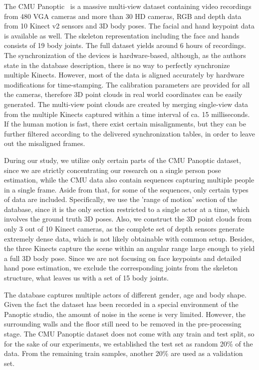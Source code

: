 The CMU Panoptic~\cite{Joo_2017_TPAMI} is a massive multi-view dataset containing video recordings from 480 VGA cameras and more than 30 HD cameras, RGB and depth data from 10 Kinect v2 sensors and 3D body poses. The facial and hand keypoint data is available as well. The skeleton representation including the face and hands consists of 19 body joints. The full dataset yields around 6 hours of recordings. The synchronization of the devices is hardware-based, although, as the authors state in the database description, there is no way to perfectly synchronize multiple Kinects. However, most of the data is aligned accurately by hardware modifications for time-stamping. The calibration parameters are provided for all the cameras, therefore 3D point clouds in real world coordinates can be easily generated. The multi-view point clouds are created by merging single-view data from the multiple Kinects captured within a time interval of ca. 15 milliseconds. If the human motion is fast, there exist certain misalignments, but they can be further filtered according to the delivered synchronization tables, in order to leave out the misaligned frames.\par
\vspace{5mm}
\noindent
During our study, we utilize only certain parts of the CMU Panoptic dataset, since we are strictly concentrating our research on a single person pose estimation, while the CMU data also contain sequences capturing multiple people in a single frame. Aside from that, for some of the sequences, only certain types of data are included. Specifically, we use the 'range of motion' section of the database, since it is the only section restricted to a single actor at a time, which involves the ground truth 3D poses. Also, we construct the 3D point clouds from only 3 out of 10 Kinect cameras, as the complete set of depth sensors generate extremely dense data, which is not likely obtainable with common setup. Besides, the three Kinects capture the scene within an angular range large enough to yield a full 3D body pose. Since we are not focusing on face keypoints and detailed hand pose estimation, we exclude the corresponding joints from the skeleton structure, what leaves us with a set of 15 body joints.\par
\vspace{5mm}
\noindent The database captures multiple actors of different gender, age and body shape. Given the fact the dataset has been recorded in a special environment of the Panoptic studio, the amount of noise in the scene is very limited. However, the surrounding walls and the floor still need to be removed in the pre-processing stage. The CMU Panoptic dataset does not come with any train and test split, so for the sake of our experiments, we established the test set as random 20\% of the data. From the remaining train samples, another 20\% are used as a validation set.



